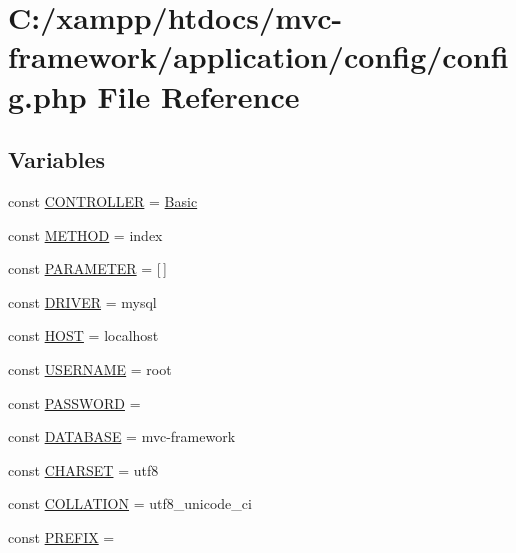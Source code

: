 \hypertarget{config_8php}{}\section{C\+:/xampp/htdocs/mvc-\/framework/application/config/config.php File Reference}
\label{config_8php}
\subsection*{Variables}
\begin{DoxyCompactItemize}
\item 
const \hyperlink{config_8php_afa55a6839ec4ad32fc00879d78229356}{C\+O\+N\+T\+R\+O\+L\+L\+ER} = \textquotesingle{}\hyperlink{class_basic}{Basic}\textquotesingle{}
\item 
const \hyperlink{config_8php_a9d70943cac2f50debb62d2008a6e768d}{M\+E\+T\+H\+OD} = \textquotesingle{}index\textquotesingle{}
\item 
const \hyperlink{config_8php_a75466fbd8ac40be3d3c185c9974118e7}{P\+A\+R\+A\+M\+E\+T\+ER} = \mbox{[}$\,$\mbox{]}
\item 
const \hyperlink{config_8php_a245dc418bdafd94609f05283931c7fc2}{D\+R\+I\+V\+ER} = \textquotesingle{}mysql\textquotesingle{}
\item 
const \hyperlink{config_8php_a6768772c01f2d4f111fabd25012e8259}{H\+O\+ST} = \textquotesingle{}localhost\textquotesingle{}
\item 
const \hyperlink{config_8php_a74aeb024c560ee70f79b2c2b039bc113}{U\+S\+E\+R\+N\+A\+ME} = \textquotesingle{}root\textquotesingle{}
\item 
const \hyperlink{config_8php_a627633cf1f3c4ee60fcc7d025a4039ed}{P\+A\+S\+S\+W\+O\+RD} = \textquotesingle{}\textquotesingle{}
\item 
const \hyperlink{config_8php_a671e180a0a9486e82d3f3ccb1f4761f6}{D\+A\+T\+A\+B\+A\+SE} = \textquotesingle{}mvc-\/framework\textquotesingle{}
\item 
const \hyperlink{config_8php_a4ca86066304d2cbb779bd8afd1efe17b}{C\+H\+A\+R\+S\+ET} = \textquotesingle{}utf8\textquotesingle{}
\item 
const \hyperlink{config_8php_a545eca516ee397b774b3f8613886fd72}{C\+O\+L\+L\+A\+T\+I\+ON} = \textquotesingle{}utf8\+\_\+unicode\+\_\+ci\textquotesingle{}
\item 
const \hyperlink{config_8php_a2a00ef970c682ccf10b5376d22fa5c8a}{P\+R\+E\+F\+IX} = \textquotesingle{}\textquotesingle{}

\end{DoxyCompactItemize}
